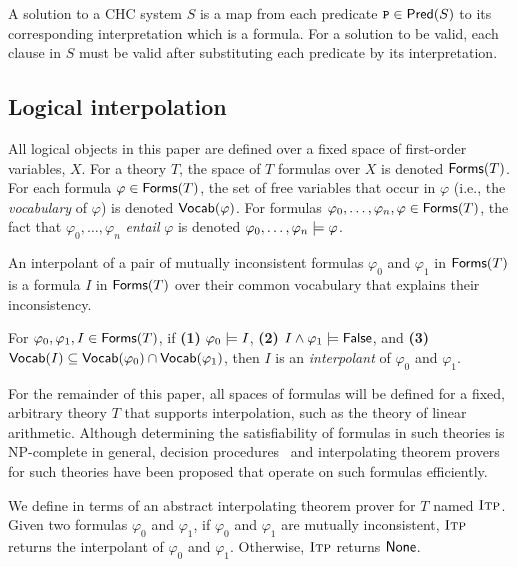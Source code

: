A solution to a CHC system $S$ is a map from each predicate $\cc{P}
\in \predof{S}$ to its corresponding interpretation which is a
formula.
%
For a solution to be valid, each clause in $S$ must be valid after
substituting each predicate by its interpretation.

\subsection{Logical interpolation}
\label{sec:itps}
%
All logical objects in this paper are defined over a fixed space of first-order
variables, $X$.
%
For a theory $T$, the space of $T$
formulas over $X$ is denoted $\mathsf{Forms}( T )$.
%
For each formula $\varphi \in \mathsf{Forms}( T )$, the set of free
variables that occur in $\varphi$ (i.e., the \emph{vocabulary} of
$\varphi$) is denoted $\mathsf{Vocab}(\varphi)$.
%
For formulas $\varphi_0, \ldots, \varphi_n, \varphi \in
\mathsf{Forms}( T )$, the fact that $\varphi_0, \ldots, \varphi_n$
\emph{entail} $\varphi$ is denoted $\varphi_0, \ldots, \varphi_n
\models \varphi$.


An interpolant of a pair of mutually inconsistent formulas
$\varphi_0$ and $\varphi_1$ in $\mathsf{Forms}( T )$ is a formula $I$ in $\mathsf{Forms}( T )$ over 
their common vocabulary that explains their inconsistency.
%
\begin{defn}
  \label{defn:itps}
  For $\varphi_0, \varphi_1, I \in \mathsf{Forms}( T )$, if
  \textbf{(1)} $\varphi_0 \models I$, %
  \textbf{(2)} $I \land \varphi_1 \models \mathsf{False}$, and %
  \textbf{(3)} $\mathsf{Vocab}(I) \subseteq \mathsf{Vocab}(\varphi_0) \cap
  \mathsf{Vocab}(\varphi_1)$,
  then $I$ is an \emph{interpolant} of $\varphi_0$ and $\varphi_1$.
\end{defn}
%
For the remainder of this paper, all spaces of formulas will be
defined for a fixed, arbitrary theory $T$ that supports
interpolation, such as the theory of linear
arithmetic.
Although determining the satisfiability of formulas in such theories
is NP-complete in general, decision procedures~\cite{moura08} and
interpolating theorem provers~\cite{mcmillan04} for such theories have
been proposed that operate on such formulas efficiently.
%

%
We define \sys in terms of an abstract interpolating theorem
prover for $T$ named $\textsc{Itp}$.
%
Given two formulas $\varphi_0$ and $\varphi_1$, if $\varphi_0$ and $\varphi_1$ are mutually 
inconsistent, $\textsc{Itp}$ returns the interpolant of $\varphi_0$ and $\varphi_1$.
%
Otherwise, $\textsc{Itp}$ returns $\mathsf{None}$.

